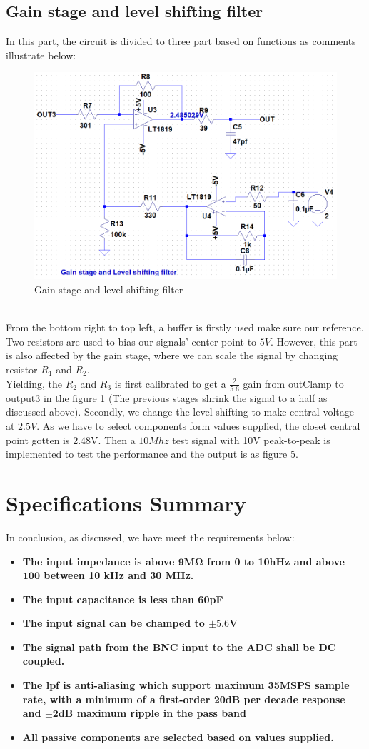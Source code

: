 \documentclass[pdftex,12pt,a4paper]{article}
\def\bf{\textbf}
\begin{document}
\subsection{Gain stage and level shifting filter}
In this part, the circuit is divided to three part based on functions as comments illustrate below:
\begin{figure}[H]
\centering
\includegraphics[width=12cm]{gainstage.png}
\caption{Gain stage and level shifting filter}
\end{figure}
~\\ From the bottom right to top left, a buffer is firstly used make sure our reference. Two resistors are used to bias our signals' center point to $5V$. However, this part is also affected by the gain stage, where we can scale the signal by changing resistor $R_1$ and $R_2$.\\
Yielding, the $R_2$ and $R_3$ is first calibrated to get a $\frac{2}{5.6}$ gain from outClamp to output3 in the figure 1 (The previous stages shrink the signal to a half as discussed above). Secondly, we change the level shifting to make central voltage at $2.5V$. As we have to select components form values supplied, the closet central point gotten is 2.48V. Then a $10Mhz$ test signal with 10V peak-to-peak is implemented to test the performance and the output is as figure 5.    
\section{Specifications Summary}
In conclusion, as discussed, we have meet the requirements below:
\begin{itemize}
\item \bf{The input impedance is above $\mathbf{9M\Omega}$ from 0 to 10hHz and above $\mathbf{100}$ between 10 kHz and 30 MHz.}
\item \bf{The input capacitance is less than 60pF}
\item \bf{The input signal can be champed to $\mathbf{\pm 5.6V}$ }
\item \bf{The signal path from the BNC input to the ADC shall be DC coupled.}
\item \bf{The lpf is anti-aliasing which support maximum 35MSPS sample rate, with a minimum of a first-order 20dB per decade response and $\mathbf{\pm 2dB}$ maximum ripple in the pass band}
\item \bf{All passive components are selected based on values supplied.}
\end{itemize}
\end{document}
